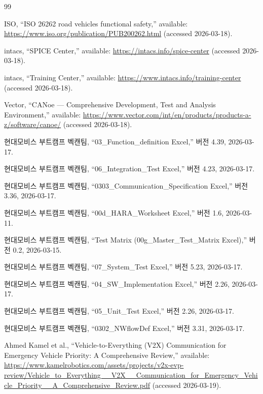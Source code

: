 \documentclass[10pt,a4paper,twocolumn]{article}
\begin{document}
\begin{thebibliography}{99}

ISO, ``ISO 26262 road vehicles functional safety,'' available: \url{https://www.iso.org/publication/PUB200262.html} (accessed 2026-03-18).

intacs, ``SPICE Center,'' available: \url{https://intacs.info/spice-center} (accessed 2026-03-18).

intacs, ``Training Center,'' available: \url{https://www.intacs.info/training-center} (accessed 2026-03-18).

Vector, ``CANoe --- Comprehensive Development, Test and Analysis Environment,'' available: \url{https://www.vector.com/int/en/products/products-a-z/software/canoe/} (accessed 2026-03-18).

현대모비스 부트캠프 벡캔팀, ``03\_Function\_definition Excel,'' 버전 4.39, 2026-03-17.

현대모비스 부트캠프 벡캔팀, ``06\_Integration\_Test Excel,'' 버전 4.23, 2026-03-17.

현대모비스 부트캠프 벡캔팀, ``0303\_Communication\_Specification Excel,'' 버전 3.36, 2026-03-17.

현대모비스 부트캠프 벡캔팀, ``00d\_HARA\_Worksheet Excel,'' 버전 1.6, 2026-03-11.

현대모비스 부트캠프 벡캔팀, ``Test Matrix (00g\_Master\_Test\_Matrix Excel),'' 버전 0.2, 2026-03-15.

현대모비스 부트캠프 벡캔팀, ``07\_System\_Test Excel,'' 버전 5.23, 2026-03-17.

현대모비스 부트캠프 벡캔팀, ``04\_SW\_Implementation Excel,'' 버전 2.26, 2026-03-17.

현대모비스 부트캠프 벡캔팀, ``05\_Unit\_Test Excel,'' 버전 2.26, 2026-03-17.

현대모비스 부트캠프 벡캔팀, ``0302\_NWflowDef Excel,'' 버전 3.31, 2026-03-17.

Ahmed Kamel et al., ``Vehicle-to-Everything (V2X) Communication for Emergency Vehicle Priority: A Comprehensive Review,'' available: \url{https://www.kamelrobotics.com/assets/projects/v2x-evp-review/Vehicle_to_Everything__V2X__Communication_for_Emergency_Vehicle_Priority__A_Comprehensive_Review.pdf} (accessed 2026-03-19).


\end{thebibliography}
\end{document}
